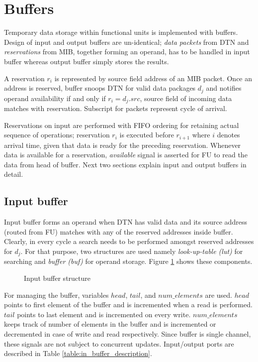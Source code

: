 \section{Buffers}
	Temporary data storage within functional units is implemented with buffers. Design of input and output buffers are un-identical; \textit{data packets} from DTN and \textit{reservations} from MIB, together forming an operand, has to be handled in input buffer whereas output buffer simply stores the results. 
	
	
	A reservation $r_i$ is represented by source field address of an MIB packet. Once an address is reserved, buffer snoops DTN for valid data packages $d_j$ and notifies operand availability if and only if $r_i = d_j.src$, \ie \hspace{1pt} source field of incoming data matches with reservation. Subscript for packets represent cycle of arrival.
	
	Reservations on input are performed with FIFO ordering for retaining actual sequence of operations; reservation $r_i$ is executed before $r_{i+1}$ where $i$ denotes arrival time, given that data is ready for the preceding reservation. Whenever data is available for a reservation, \textit{available} signal is asserted for FU to read the data from head of buffer.  
	 Next two sections explain input and output buffers in detail.
	
	\subsection{Input buffer}
	Input buffer forms an operand when DTN has valid data and its source address (routed from FU) matches with any of the reserved addresses inside buffer. Clearly, in every cycle a search needs to be performed amongst reserved addresses for $d_j$. For that purpose, two structures are used namely \textit{look-up-table (lut)} for searching and \textit{buffer (buf)} for operand storage. Figure \ref{fig:input_buffer} shows these components.
	
	\begin{figure}[htbp]
		\centering
		\def\svgwidth{\columnwidth}
		
		\caption{Input buffer structure}
		\label{fig:input_buffer} 
	\end{figure}
	
	For managing the buffer, variables $head$, $tail$, and $num\_elements$ are used. $head$ points to first element of the buffer and is incremented when a read is performed. $tail$ points to last element and is incremented on every write. $num\_elements$ keeps track of number of elements in the buffer and is incremented or decremented in case of write and read respectively. Since buffer is single channel, these signals are not subject to concurrent updates. Input/output ports are described in Table \ref{table:in_buffer_description}.
	
